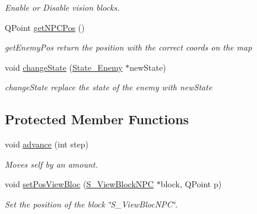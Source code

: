 \begin{DoxyCompactItemize}
\begin{DoxyCompactList}\small\item\em Enable or Disable vision blocks. \end{DoxyCompactList}\item 
Q\+Point \hyperlink{class_c___enemy_a3d6fe05b8f728777a5696d485f6e512a}{get\+N\+P\+C\+Pos} ()
\begin{DoxyCompactList}\small\item\em get\+Enemy\+Pos return the position with the correct coords on the map \end{DoxyCompactList}\item 
void \hyperlink{class_c___enemy_ad6d010c0c1592beb687eb36e71d9978e}{change\+State} (\hyperlink{class_state___enemy}{State\+\_\+\+Enemy} $\ast$new\+State)
\begin{DoxyCompactList}\small\item\em change\+State replace the state of the enemy with new\+State \end{DoxyCompactList}\end{DoxyCompactItemize}
\subsection*{Protected Member Functions}
\begin{DoxyCompactItemize}
\item 
void \hyperlink{class_c___enemy_a09e76be8e6f7d6037094057d10ee1cc6}{advance} (int step)
\begin{DoxyCompactList}\small\item\em Moves self by an amount. \end{DoxyCompactList}\item 
void \hyperlink{class_c___enemy_ae0e402984274dadd62a17150b21f63f7}{set\+Pos\+View\+Bloc} (\hyperlink{class_s___view_block_n_p_c}{S\+\_\+\+View\+Block\+N\+P\+C} $\ast$block, Q\+Point p)
\begin{DoxyCompactList}\small\item\em Set the position of the block \char`\"{}\+S\+\_\+\+View\+Bloc\+N\+P\+C\char`\"{}. \end{DoxyCompactList}\end{DoxyCompactItemize}
